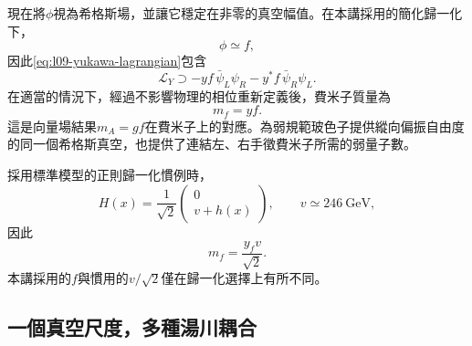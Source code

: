 現在將\(\phi\)視為希格斯場，並讓它穩定在非零的真空幅值。在本講採用的簡化歸一化下，
\begin{equation}
  \phi\simeq f,
\end{equation}
因此\eqref{eq:l09-yukawa-lagrangian}包含
\begin{equation}
  \mathcal L_Y
  \supset
  -yf\,\bar\psi_L\psi_R
  -y^*f\,\bar\psi_R\psi_L .
\end{equation}
在適當的情況下，經過不影響物理的相位重新定義後，費米子質量為
\begin{equation}
  m_f=yf.
  \label{eq:l09-lecture-fermion-mass}
\end{equation}
這是向量場結果\(m_A=gf\)在費米子上的對應。為弱規範玻色子提供縱向偏振自由度的同一個希格斯真空，也提供了連結左、右手徵費米子所需的弱量子數。

採用標準模型的正則歸一化慣例時，
\begin{equation}
  H(x)=\frac1{\sqrt2}
  \begin{pmatrix}
    0\\ v+h(x)
  \end{pmatrix},
  \qquad v\simeq246\ \mathrm{GeV},
  \label{eq:l09-sm-higgs-vacuum}
\end{equation}
因此
\begin{equation}
  m_f=\frac{y_fv}{\sqrt2}.
  \label{eq:l09-sm-fermion-mass}
\end{equation}
本講採用的\(f\)與慣用的\(v/\sqrt2\)僅在歸一化選擇上有所不同。

\begin{classroomqa}
\end{classroomqa}

\begin{classroomqa}
\end{classroomqa}

\subsection{一個真空尺度，多種湯川耦合}

